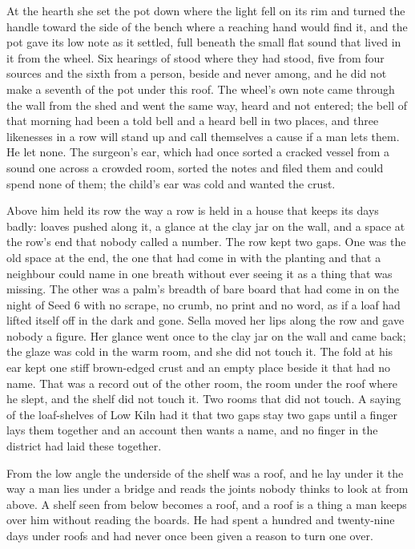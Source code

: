 At the hearth she set the pot down where the light fell on its rim and turned the handle toward the side of the bench where a reaching hand would find it, and the pot gave its low note as it settled, full beneath the small flat sound that lived in it from the wheel. Six hearings of  stood where they had stood, five from four sources and the sixth from a person, beside and never among, and he did not make a seventh of the pot under this roof. The wheel's own note came through the wall from the shed and went the same way, heard and not entered; the bell of that morning had been a told bell and a heard bell in two places, and three likenesses in a row will stand up and call themselves a cause if a man lets them. He let none. The surgeon's ear, which had once sorted a cracked vessel from a sound one across a crowded room, sorted the notes and filed them and could spend none of them; the child's ear was cold and wanted the crust.

Above him  held its row the way a row is held in a house that keeps its days badly: loaves pushed along it, a glance at the clay jar on the wall, and a space at the row's end that nobody called a number. The row kept two gaps. One was the old space at the end, the one that had come in with the planting and that a neighbour could name in one breath without ever seeing it as a thing that was missing. The other was a palm's breadth of bare board that had come in on the night of Seed 6 with no scrape, no crumb, no print and no word, as if a loaf had lifted itself off in the dark and gone. Sella moved her lips along the row and gave nobody a figure. Her glance went once to the clay jar on the wall and came back; the glaze was cold in the warm room, and she did not touch it. The fold at his ear kept one stiff brown-edged crust and an empty place beside it that had no name. That was a record out of the other room, the room under the roof where he slept, and the shelf did not touch it. Two rooms that did not touch. A saying of the loaf-shelves of Low Kiln had it that two gaps stay two gaps until a finger lays them together and an account then wants a name, and no finger in the district had laid these together.

From the low angle the underside of the shelf was a roof, and he lay under it the way a man lies under a bridge and reads the joints nobody thinks to look at from above. A shelf seen from below becomes a roof, and a roof is a thing a man keeps over him without reading the boards. He had spent a hundred and twenty-nine days under roofs and had never once been given a reason to turn one over.

